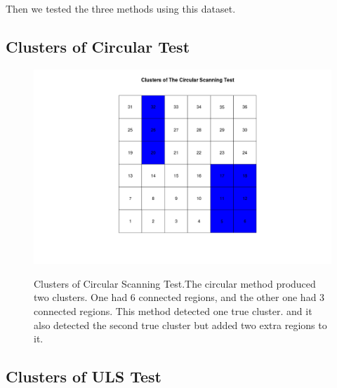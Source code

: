 \documentclass[12pt]{article}
\begin{document}
	Then we tested the three methods using this dataset. \\
	
	\subsection{Clusters of Circular Test } 
	 
	 \begin{figure}[!ht]
	 	
	 	\centering
	 	\includegraphics[scale=0.4]{Ex1_Circular}\\
	 	\caption{Clusters of Circular Scanning Test.The circular method produced two clusters. One had 6 connected regions, and the other one had 3 connected regions. This method detected one true cluster. and it also detected the second true cluster but added two extra regions to it.\label{f:gull}}
	 	
	 \end{figure}
	 
\newpage	 
\subsection{Clusters of ULS Test}
		
	
	
\end{document}
